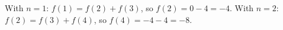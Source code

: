 With $n=1$: $f(1)=f(2)+f(3)$, so $f(2)=0-4=-4$. With $n=2$: $f(2)=f(3)+f(4)$, so $f(4)=-4-4=\boxed{-8}$.
